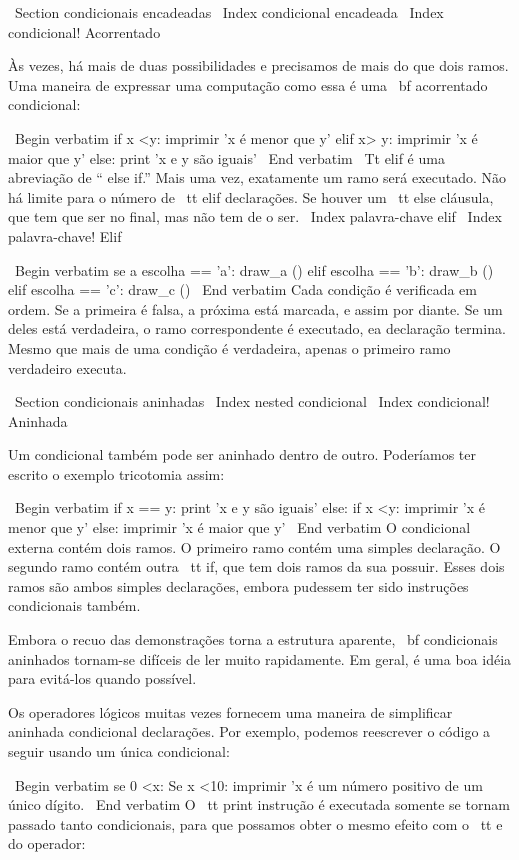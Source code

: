\documentclass[10pt]{book}
\begin{document}
\begin {itemize}
{{\ Section {} condicionais encadeadas
\ Index {condicional encadeada}
\ Index {condicional! Acorrentado}

Às vezes, há mais de duas possibilidades e precisamos de mais do que
dois ramos. Uma maneira de expressar uma computação como essa é uma {\ bf
acorrentado condicional}:

\ Begin {verbatim}
if x <y:
    imprimir 'x é menor que y'
elif x> y:
    imprimir 'x é maior que y'
else:
    print 'x e y são iguais'
\ End {verbatim}
%
{\ Tt} elif é uma abreviação de `` else if.'' Mais uma vez, exatamente um
ramo será executado. Não há limite para o número de {\ tt
elif} declarações. Se houver um {\ tt} else cláusula, que tem que ser
no final, mas não tem de o ser.
\ Index {palavra-chave elif}
\ Index {palavra-chave! Elif}


\ Begin {verbatim}
se a escolha == 'a':
    draw_a ()
elif escolha == 'b':
    draw_b ()
elif escolha == 'c':
    draw_c ()
\ End {verbatim}
%
Cada condição é verificada em ordem. Se a primeira é falsa,
a próxima está marcada, e assim por diante. Se um deles está
verdadeira, o ramo correspondente é executado, ea declaração
termina. Mesmo que mais de uma condição é verdadeira, apenas o
primeiro ramo verdadeiro executa.  


\ Section {} condicionais aninhadas
\ Index {nested condicional}
\ Index {condicional! Aninhada}

Um condicional também pode ser aninhado dentro de outro. Poderíamos ter
escrito o exemplo tricotomia assim:

\ Begin {verbatim}
if x == y:
    print 'x e y são iguais'
else:
    if x <y:
        imprimir 'x é menor que y'
    else:
        imprimir 'x é maior que y'
\ End {verbatim}
%
O condicional externa contém dois ramos. O
primeiro ramo contém uma simples declaração. O segundo ramo
contém outra {\ tt if}, que tem dois ramos da sua
possuir. Esses dois ramos são ambos simples declarações,
embora pudessem ter sido instruções condicionais também.

Embora o recuo das demonstrações torna a estrutura
aparente, {\ bf condicionais aninhados} tornam-se difíceis de ler muito
rapidamente. Em geral, é uma boa idéia para evitá-los quando possível.

Os operadores lógicos muitas vezes fornecem uma maneira de simplificar aninhada condicional
declarações. Por exemplo, podemos reescrever o código a seguir usando um
única condicional:

\ Begin {verbatim}
se 0 <x:
    Se x <10:
        imprimir 'x é um número positivo de um único dígito.
\ End {verbatim}
%
O {\ tt print} instrução é executada somente se tornam passado tanto
condicionais, para que possamos obter o mesmo efeito com o {\ tt e} do operador:

}}
\end{itemize}
\end{document}
